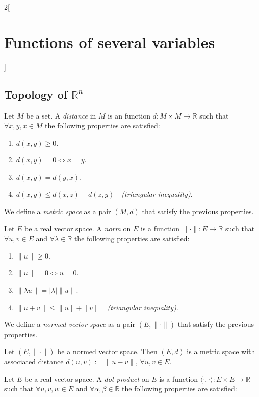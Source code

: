 \documentclass[class=article,10pt,crop=false]{standalone}
\begin{document}
\begin{multicols}{2}[\section{Functions of several variables}]
\subsection{Topology of \texorpdfstring{$\mathbb{R}^n$}{Rn}}
\begin{definition}
Let $M$ be a set. A \textit{distance} in $M$ is an function $d:M\times M\rightarrow\mathbb{R}$ such that $\forall x,y,x\in M$ the following properties are satisfied:
\begin{enumerate}
    \item $d(x,y)\geq 0$.
    \item $d(x,y)=0\iff x=y$.
    \item $d(x,y)=d(y,x)$.
    \item $d(x,y)\leq d(x,z)+d(z,y)\quad$\textit{(triangular inequality)}.
\end{enumerate}
We define a \textit{metric space} as a pair $(M,d)$ that satisfy the previous properties.
\label{FOSV_metric}
\end{definition}
\begin{definition}
Let $E$ be a real vector space. A \textit{norm} on $E$ is a function $\|\cdot\|:E\rightarrow\mathbb{R}$ such that $\forall u,v\in E$ and $\forall\lambda\in\mathbb{R}$ the following properties are satisfied:
\begin{enumerate}
    \item $\|u\|\geq 0$.
    \item $\|u\|=0\iff u=0$.
    \item $\|\lambda u\|=|\lambda|\|u\|$.
    \item $\|u+v\|\leq \|u\|+\|v\|\quad$\textit{(triangular inequality)}.
\end{enumerate}
We define a \textit{normed vector space} as a pair $(E,\|\cdot\|)$ that satisfy the previous properties.
\end{definition}
\begin{prop}
Let $(E,\|\cdot\|)$ be a normed vector space. Then $(E,d)$ is a metric space with associated distance $d(u,v):=\|u-v\|$, $\forall u,v\in E$.
\end{prop}
\begin{definition}
Let $E$ be a real vector space. A \textit{dot product} on $E$ is a function $\langle\cdot,\cdot\rangle:E\times E\rightarrow\mathbb{R}$ such that $\forall u,v,w\in E$ and $\forall\alpha,\beta\in\mathbb{R}$ the following properties are satisfied:

\end{definition}
\end{multicols}
\end{document}
